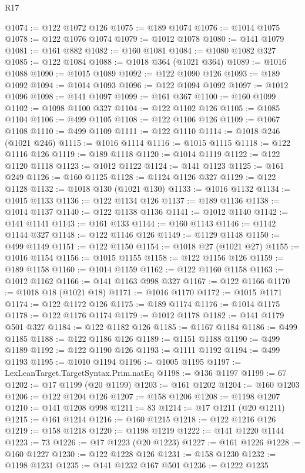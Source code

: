 \begin{lexlean}{R17}
\begin{coremodule}
@1074 := @122 @1072 @126
@1075 := @189 @1074
@1076 := @1014 @1075
@1078 := @122 @1076 @1074
@1079 := @1012 @1078
@1080 := @141 @1079
@1081 := @161 @882
@1082 := @160 @1081
@1084 := @1080 @1082 @327
@1085 := @122 @1084
@1088 := @1018 @364 (@1021 @364)
@1089 := @1016 @1088
@1090 := @1015 @1089
@1092 := @122 @1090 @126
@1093 := @189 @1092
@1094 := @1014 @1093
@1096 := @122 @1094 @1092
@1097 := @1012 @1096
@1098 := @141 @1097
@1099 := @161 @367
@1100 := @160 @1099
@1102 := @1098 @1100 @327
@1104 := @122 @1102 @126
@1105 := @1085 @1104
@1106 := @499 @1105
@1108 := @122 @1106 @126
@1109 := @1067 @1108
@1110 := @499 @1109
@1111 := @122 @1110
@1114 := @1018 @246 (@1021 @246)
@1115 := @1016 @1114
@1116 := @1015 @1115
@1118 := @122 @1116 @126
@1119 := @189 @1118
@1120 := @1014 @1119
@1122 := @122 @1120 @1118
@1123 := @1012 @1122
@1124 := @141 @1123
@1125 := @161 @249
@1126 := @160 @1125
@1128 := @1124 @1126 @327
@1129 := @122 @1128
@1132 := @1018 @130 (@1021 @130)
@1133 := @1016 @1132
@1134 := @1015 @1133
@1136 := @122 @1134 @126
@1137 := @189 @1136
@1138 := @1014 @1137
@1140 := @122 @1138 @1136
@1141 := @1012 @1140
@1142 := @141 @1141
@1143 := @161 @133
@1144 := @160 @1143
@1146 := @1142 @1144 @327
@1148 := @122 @1146 @126
@1149 := @1129 @1148
@1150 := @499 @1149
@1151 := @122 @1150
@1154 := @1018 @27 (@1021 @27)
@1155 := @1016 @1154
@1156 := @1015 @1155
@1158 := @122 @1156 @126
@1159 := @189 @1158
@1160 := @1014 @1159
@1162 := @122 @1160 @1158
@1163 := @1012 @1162
@1166 := @141 @1163 @998 @327
@1167 := @122 @1166
@1170 := @1018 @18 (@1021 @18)
@1171 := @1016 @1170
@1172 := @1015 @1171
@1174 := @122 @1172 @126
@1175 := @189 @1174
@1176 := @1014 @1175
@1178 := @122 @1176 @1174
@1179 := @1012 @1178
@1182 := @141 @1179 @501 @327
@1184 := @122 @1182 @126
@1185 := @1167 @1184
@1186 := @499 @1185
@1188 := @122 @1186 @126
@1189 := @1151 @1188
@1190 := @499 @1189
@1192 := @122 @1190 @126
@1193 := @1111 @1192
@1194 := @499 @1193
@1195 := @1010 @1194
@1196 := @1005 @1195
@1197 := LexLeanTarget.TargetSyntax.Prim.natEq
@1198 := @136 @1197
@1199 := 67
@1202 := @17 @1199 (@20 @1199)
@1203 := @161 @1202
@1204 := @160 @1203
@1206 := @122 @1204 @126
@1207 := @158 @1206
@1208 := @1198 @1207
@1210 := @141 @1208 @998
@1211 := 83
@1214 := @17 @1211 (@20 @1211)
@1215 := @161 @1214
@1216 := @160 @1215
@1218 := @122 @1216 @126
@1219 := @158 @1218
@1220 := @1198 @1219
@1222 := @141 @1220 @1144
@1223 := 73
@1226 := @17 @1223 (@20 @1223)
@1227 := @161 @1226
@1228 := @160 @1227
@1230 := @122 @1228 @126
@1231 := @158 @1230
@1232 := @1198 @1231
@1235 := @141 @1232 @167 @501
@1236 := @1222 @1235

\end{coremodule}
\end{lexlean}
